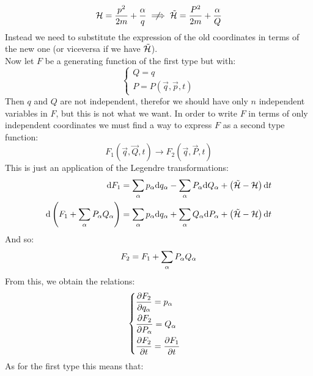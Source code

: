 \begin{equation}
    \hamfun = \dfrac{p^2}{2m} + \dfrac{\alpha}{q} \notimplies \tilde{\hamfun} = \dfrac{P^2}{2m} + \dfrac{\alpha}{Q}
\end{equation}
Instead we need to substitute the expression of the old coordinates in terms of the new one (or viceversa if we have $\tilde{\mathcal{H}}$).\\
Now let $F$ be a generating function of the first type but with:
\begin{equation}
    \begin{cases}
        Q = q\\
        P = P(\vec{q},\vec{p},t)
    \end{cases}
\end{equation}
Then $q$ and $Q$ are not independent, therefor we should have only $n$ independent variables in $F$, but this is not what we want. In order to write $F$ in terms of only independent coordinates we must find a way to express $F$ as a second type function:
\begin{equation}
    F_1(\vec{q},\vec{Q},t) \longrightarrow F_2(\vec{q},\vec{P},t)
\end{equation}
This is just an application of the Legendre transformations:
\begin{equation}
    \begin{split}
        \mathrm{d}F_1 &= \displaystyle\sum_{\alpha}p_{\alpha}\mathrm{d}q_{\alpha} - \displaystyle\sum_{\alpha}P_{\alpha}\mathrm{d}Q_{\alpha} + \left(\tilde{\mathcal{H}}- \mathcal{H}\right)\mathrm{d}t\\
        \mathrm{d}\left(F_1 + \displaystyle\sum_{\alpha}P_{\alpha}Q_{\alpha}\right) &= \displaystyle\sum_{\alpha}p_{\alpha}\mathrm{d}q_{\alpha}  + \displaystyle\sum_{\alpha}Q_{\alpha}\mathrm{d}P_{\alpha} + \left(\tilde{\mathcal{H}}- \mathcal{H}\right)\mathrm{d}t
    \end{split}
\end{equation}
And so:
\begin{equation}
    F_2 = F_1 + \displaystyle\sum_{\alpha}P_{\alpha}Q_{\alpha}
\end{equation}
From this, we obtain the relations:
\begin{equation}
    \begin{cases}
        \dfrac{\partial F_2}{\partial q_{\alpha}} = p_{\alpha}\\[8pt]
        \dfrac{\partial F_2}{\partial P_{\alpha}} = Q_{\alpha}\\[8pt]
        \dfrac{\partial F_2}{\partial t} = \dfrac{\partial F_1}{\partial t}
    \end{cases}
\end{equation}
As for the first type this means that:
